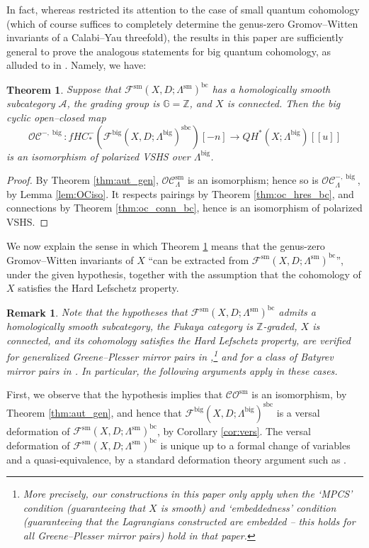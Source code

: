 \documentclass{article}
\newtheorem{rem}[lem]{Remark}
\newtheorem{thm}[lem]{Theorem}
\def\G{\mathbb{G}}
\def\fuk{\EuF}
\def\bc{\mathsf{bc}}
\def\G{\mathbb{G}}
\def\cO{\mathcal{O}}
\def\cA{\mathcal{A}}
\def\cC{\mathcal{C}}
\def\Z{\mathbb{Z}}
\def\fuk{\mathcal{F}}
\def\bc{{\operatorname{bc}}}
\def\big{{\operatorname{big}}}
\def\sm{{\operatorname{sm}}}
\def\sbc{{\operatorname{sbc}}}
\begin{document}
In fact, whereas \cite{Ganatra2015} restricted its attention to the case of small quantum cohomology (which of course suffices to completely determine the genus-zero Gromov--Witten invariants of a Calabi--Yau threefold), the results in this paper are sufficiently general to prove the analogous statements for big quantum cohomology, as alluded to in \cite[Remark 1.20]{Ganatra2015}. 
Namely, we have:

\begin{thm}\label{thm:vshs}
    Suppose that $\fuk^\sm(X,D;\Lambda^\sm)^\bc$ has a homologically smooth subcategory $\cA$, the grading group is $\G = \Z$, and $X$ is connected. 
    Then the big cyclic open--closed map
    $$\cO\cC^{-,\big}:fHC_*^-(\fuk^\big(X,D;\Lambda^\big)^\sbc)[-n] \to QH^*(X;\Lambda^\big)[[u]]$$
    is an isomorphism of polarized VSHS over $\Lambda^\big$. 
\end{thm}
\begin{proof}
    By Theorem \ref{thm:aut_gen}, $\cO\cC^\sm_\Lambda$ is an isomorphism; hence so is $\cO\cC^{-,\big}_\Lambda$, by Lemma \ref{lem:OCiso}. 
    It respects pairings by Theorem \ref{thm:oc_hres_bc}, and connections by Theorem \ref{thm:oc_conn_bc}, hence is an isomorphism of polarized VSHS.
\end{proof}

We now explain the sense in which Theorem \ref{thm:vshs} means that the genus-zero Gromov--Witten invariants of $X$ ``can be extracted from $\fuk^\sm(X,D;\Lambda^\sm)^\bc$'', under the given hypothesis, together with the assumption that the cohomology of $X$ satisfies the Hard Lefschetz property. 

\begin{rem}
    Note that the hypotheses that $\fuk^\sm(X,D;\Lambda^\sm)^\bc$ admits a homologically smooth subcategory, the Fukaya category is $\Z$-graded, $X$ is connected, and its cohomology satisfies the Hard Lefschetz property, are verified for generalized Greene--Plesser mirror pairs in \cite[Theorem D]{sheridan2021homological},\footnote{More precisely, our constructions in this paper only apply when the `MPCS' condition (guaranteeing that $X$ is smooth) and `embeddedness' condition (guaranteeing that the Lagrangians constructed are embedded -- this holds for all Greene--Plesser mirror pairs) hold in that paper.} and for a class of Batyrev mirror pairs in \cite[Theorem B]{GHHPS}. 
    In particular, the following arguments apply in these cases.
\end{rem}

First, we observe that the hypothesis implies that $\cC\cO^\sm$ is an isomorphism, by Theorem \ref{thm:aut_gen}, and hence that $\fuk^\big(X,D;\Lambda^\big)^\sbc$ is a versal deformation of $\fuk^\sm(X,D;\Lambda^\sm)^\bc$, by Corollary \ref{cor:vers}. 
The versal deformation of $\fuk^\sm(X,D;\Lambda^\sm)^\bc$ is unique up to a formal change of variables and a quasi-equivalence, by a standard deformation theory argument such as \cite[Theorem 3.3]{Sheridan_CDM}. 
\end{document}
